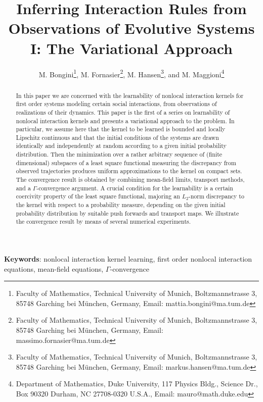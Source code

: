 \documentclass[A4paper,11pt]{article}
\title{Inferring Interaction Rules from Observations of Evolutive Systems I: The Variational Approach}
\author{M. Bongini\footnote{Faculty of Mathematics, Technical University of Munich, Boltzmannstrasse 3, 85748 Garching bei M\"unchen, Germany, Email: mattia.bongini@ma.tum.de}, 
M. Fornasier\footnote{Faculty of Mathematics, Technical University of Munich, Boltzmannstrasse 3, 85748 Garching bei M\"unchen, Germany, Email: massimo.fornasier@ma.tum.de}, 
M. Hansen\footnote{Faculty of Mathematics, Technical University of Munich, Boltzmannstrasse 3, 85748 Garching bei M\"unchen, Germany, Email: markus.hansen@ma.tum.de}, 
and M. Maggioni\footnote{Department of Mathematics, Duke University, 	117 Physics Bldg., Science Dr., Box 90320
Durham, NC 27708-0320
U.S.A., Email: mauro@math.duke.edu}}
\date{}
\theoremstyle{definition}
\begin{document}
\maketitle

\begin{abstract}
In this paper we are concerned with the  learnability of nonlocal interaction kernels for  first order systems modeling certain social interactions, from observations of realizations of their dynamics. This paper is the first  of a series  on learnability of nonlocal interaction kernels and presents a variational approach to the problem. In particular, we assume here that  the kernel to be learned is bounded and locally Lipschitz continuous and that the initial conditions of the systems are drawn identically and independently at random according to a given initial probability distribution. Then the minimization over a rather arbitrary  sequence of (finite dimensional) subspaces of a least square functional measuring the discrepancy from observed trajectories  produces uniform approximations to the kernel on compact sets. The convergence result is obtained by combining mean-field limits, transport methods, and a $\Gamma$-convergence argument. A crucial condition for the learnability is a certain coercivity property of the least square functional, majoring an $L_2$-norm discrepancy to the kernel with respect to a probability measure, depending on the given initial probability distribution by suitable push forwards and transport maps. We illustrate the convergence result by means of several numerical experiments. 
\end{abstract}
{\bf Keywords}: nonlocal interaction kernel learning, first order nonlocal interaction equations, mean-field equations, $\Gamma$-convergence

\bigskip

\tableofcontents












\end{document}
